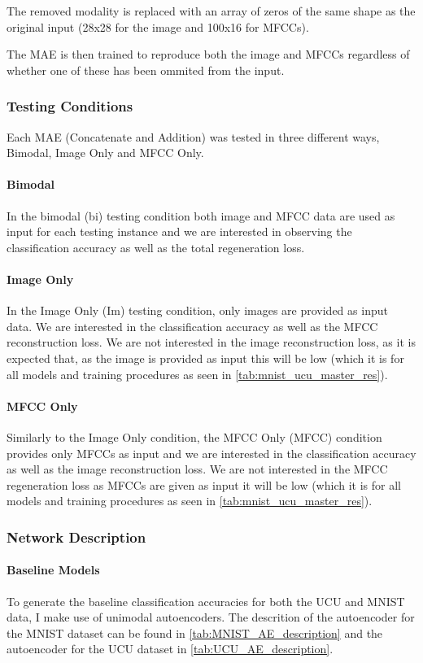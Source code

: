 The removed modality is replaced with an array of zeros of the same shape as the original input (28x28 for the image and 100x16 for MFCCs).

The MAE is then trained to reproduce both the image and MFCCs regardless of whether one of these has been ommited from the input.

\subsubsection{Testing Conditions}
Each MAE (Concatenate and Addition) was tested in three different ways, Bimodal, Image Only and MFCC Only.

\paragraph{Bimodal}
In the bimodal (bi) testing condition both image and MFCC data are used as input for each testing instance and we are interested in observing the classification accuracy as well as the total regeneration loss.

\paragraph{Image Only}
In the Image Only (Im) testing condition, only images are provided as input data. We are interested in the classification accuracy as well as the MFCC reconstruction loss. We are not interested in the image reconstruction loss, as it is expected that, as the image is provided as input this will be low (which it is for all models and training procedures as seen in \autoref{tab:mnist_ucu_master_res}).  

\paragraph{MFCC Only}
Similarly to the Image Only condition, the MFCC Only (MFCC) condition provides only MFCCs as input and we are interested in the classification accuracy as well as the image reconstruction loss. We are not interested in the MFCC regeneration loss as MFCCs are given as input it will be low (which it is for all models and training procedures as seen in \autoref{tab:mnist_ucu_master_res}).  

\subsubsection{Network Description}
\paragraph{Baseline Models}
To generate the baseline classification accuracies for both the UCU and MNIST data, I make use of unimodal autoencoders. The descrition of the autoencoder for the MNIST dataset can be found in \autoref{tab:MNIST_AE_description} and the autoencoder for the UCU dataset in \autoref{tab:UCU_AE_description}.

